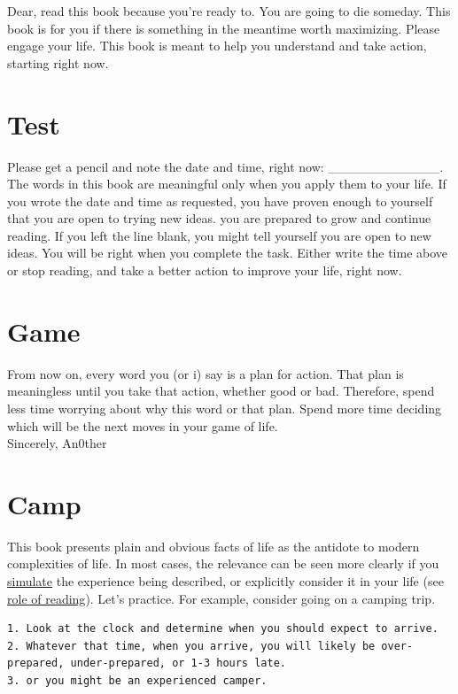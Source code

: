 \documentclass[
]{book}
\begin{document}
Dear, read this book because you're ready to.
You are going to die someday. This book is for you if there is something in the meantime worth maximizing.
Please engage your life. This book is meant to help you understand and take action, starting right now.

\hypertarget{test}{%
\section{Test}\label{test}}

Please get a pencil and note the date and time, right now: \_\_\_\_\_\_\_\_\_\_\_\_.
The words in this book are meaningful only when you apply them to your life.
If you wrote the date and time as requested, you have proven enough to yourself that you are open to trying new ideas. you are prepared to grow and continue reading.
If you left the line blank, you might tell yourself you are open to new ideas. You will be right when you complete the task.
Either write the time above or stop reading, and take a better action to improve your life, right now.

\hypertarget{game}{%
\section{Game}\label{game}}

From now on, every word you (or i) say is a plan for action.
That plan is meaningless until you take that action, whether good or bad.
Therefore, spend less time worrying about why this word or that plan.
Spend more time deciding which will be the next moves in your game of life.\\
Sincerely, An0ther

\hypertarget{camp}{%
\section{Camp}\label{camp}}

This book presents plain and obvious facts of life as the antidote to modern complexities of life.
In most cases, the relevance can be seen more clearly if you \protect\hyperlink{words}{simulate} the experience being described, or explicitly consider it in your life (see \protect\hyperlink{word-read}{role of reading}). Let's practice. For example, consider going on a camping trip.

\begin{verbatim}
1. Look at the clock and determine when you should expect to arrive.
2. Whatever that time, when you arrive, you will likely be over- prepared, under-prepared, or 1-3 hours late.
3. or you might be an experienced camper.
\end{verbatim}
\end{document}

